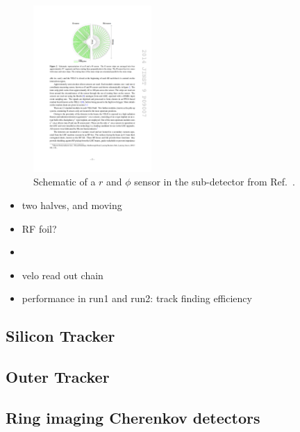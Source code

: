 \begin{figure}[!h]
    \centering
    \includegraphics[width=0.4\textwidth]{figs/Detector/velo_r_phi_sensor.pdf}
    \caption{Schematic of a $r$ and $\phi$ sensor in the \velo sub-detector from Ref.~\cite{LHCb-DP-2014-001}.}
    \label{fig:Dec_velo_sensor_Schematic}   
\end{figure}


{\color{Red}
\begin{itemize}
\item two halves, and moving
\item RF foil?
\item 
\item velo read out chain
\item performance in run1 and run2: track finding efficiency 
\end{itemize}
}




\subsection{Silicon Tracker}
\subsection{Outer Tracker}
\subsection{Ring imaging Cherenkov detectors}
\subsubsection{\richone}
\subsubsection{\richtwo}
